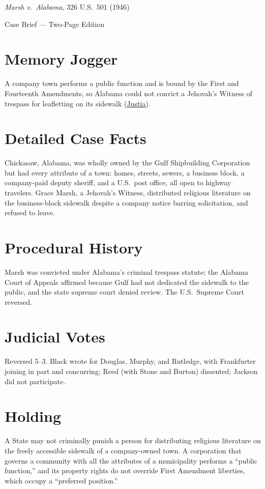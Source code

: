 \documentclass[12pt]{article}
\begin{document}
\begin{center}
{\LARGE \textit{Marsh v.\ Alabama}, 326 U.S.\ 501 (1946)\par}
\vspace{0.5em}
{\large Case Brief --- Two-Page Edition\par}
\end{center}

\section{Memory Jogger}
A company town performs a public function and is bound by the First and Fourteenth Amendments, so Alabama could not convict a Jehovah's Witness of trespass for leafletting on its sidewalk (\href{https://supreme.justia.com/cases/federal/us/326/501/}{Justia}).

\section{Detailed Case Facts}
Chickasaw, Alabama, was wholly owned by the Gulf Shipbuilding Corporation but had every attribute of a town: homes, streets, sewers, a business block, a company-paid deputy sheriff, and a U.S.\ post office, all open to highway travelers. Grace Marsh, a Jehovah's Witness, distributed religious literature on the business-block sidewalk despite a company notice barring solicitation, and refused to leave.

\section{Procedural History}
Marsh was convicted under Alabama's criminal trespass statute; the Alabama Court of Appeals affirmed because Gulf had not dedicated the sidewalk to the public, and the state supreme court denied review. The U.S.\ Supreme Court reversed.

\section{Judicial Votes}
Reversed 5--3. Black wrote for Douglas, Murphy, and Rutledge, with Frankfurter joining in part and concurring; Reed (with Stone and Burton) dissented; Jackson did not participate.

\section{Holding}
A State may not criminally punish a person for distributing religious literature on the freely accessible sidewalk of a company-owned town. A corporation that governs a community with all the attributes of a municipality performs a ``public function,'' and its property rights do not override First Amendment liberties, which occupy a ``preferred position.''
\end{document}
